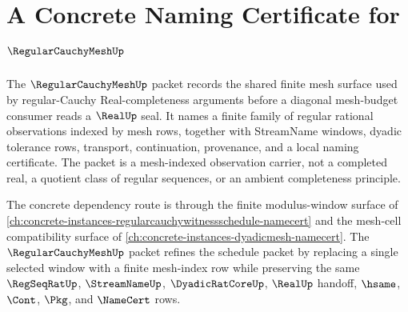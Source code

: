 \chapter{A Concrete Naming Certificate for $\RegularCauchyMeshUp$}
\label{ch:concrete-instances-regular-cauchy-mesh-namecert}

The $\RegularCauchyMeshUp$ packet records the shared finite mesh surface used by regular-Cauchy Real-completeness arguments before a diagonal mesh-budget consumer reads a $\RealUp$ seal. It names a finite family of regular rational observations indexed by mesh rows, together with StreamName windows, dyadic tolerance rows, transport, continuation, provenance, and a local naming certificate. The packet is a mesh-indexed observation carrier, not a completed real, a quotient class of regular sequences, or an ambient completeness principle.

The concrete dependency route is through the finite modulus-window surface of \autoref{ch:concrete-instances-regularcauchywitnessschedule-namecert} and the mesh-cell compatibility surface of \autoref{ch:concrete-instances-dyadicmesh-namecert}. The $\RegularCauchyMeshUp$ packet refines the schedule packet by replacing a single selected window with a finite mesh-index row while preserving the same $\RegSeqRatUp$, $\StreamNameUp$, $\DyadicRatCoreUp$, $\RealUp$ handoff, $\hsame$, $\Cont$, $\Pkg$, and $\NameCert$ rows.

